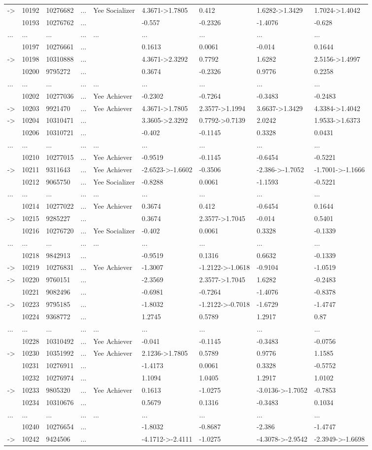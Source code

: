 \documentclass[6pt,a4paper]{article}
\begin{document}
{\begin{longtable}{lllllllll}
-\textgreater &10192&10276682&...&Yee Socializer&4.3671-\textgreater 1.7805&0.412&1.6282-\textgreater 1.3429&1.7024-\textgreater 1.4042\tabularnewline
&10193&10276762&...&&-0.557&-0.2326&-1.4076&-0.628\tabularnewline
...&...&...&...&...&...&...&...&...\tabularnewline
&10197&10276661&...&&0.1613&0.0061&-0.014&0.1644\tabularnewline
-\textgreater &10198&10310888&...&&4.3671-\textgreater 2.3292&0.7792&1.6282&2.5156-\textgreater 1.4997\tabularnewline
&10200&9795272&...&&0.3674&-0.2326&0.9776&0.2258\tabularnewline
...&...&...&...&...&...&...&...&...\tabularnewline
&10202&10277036&...&Yee Achiever&-0.2302&-0.7264&-0.3483&-0.2483\tabularnewline
-\textgreater &10203&9921470&...&Yee Achiever&4.3671-\textgreater 1.7805&2.3577-\textgreater 1.1994&3.6637-\textgreater 1.3429&4.3384-\textgreater 1.4042\tabularnewline
-\textgreater &10204&10310471&...&&3.3605-\textgreater 2.3292&0.7792-\textgreater 0.7139&2.0242&1.9533-\textgreater 1.6373\tabularnewline
&10206&10310721&...&&-0.402&-0.1145&0.3328&0.0431\tabularnewline
...&...&...&...&...&...&...&...&...\tabularnewline
&10210&10277015&...&Yee Achiever&-0.9519&-0.1145&-0.6454&-0.5221\tabularnewline
-\textgreater &10211&9311643&...&Yee Achiever&-2.6523-\textgreater -1.6602&-0.3506&-2.386-\textgreater -1.7052&-1.7001-\textgreater -1.1666\tabularnewline
&10212&9065750&...&Yee Socializer&-0.8288&0.0061&-1.1593&-0.5221\tabularnewline
...&...&...&...&...&...&...&...&...\tabularnewline
&10214&10277022&...&Yee Achiever&0.3674&0.412&-0.6454&0.1644\tabularnewline
-\textgreater &10215&9285227&...&&0.3674&2.3577-\textgreater 1.7045&-0.014&0.5401\tabularnewline
&10216&10276720&...&Yee Socializer&-0.402&0.0061&0.3328&-0.1339\tabularnewline
...&...&...&...&...&...&...&...&...\tabularnewline
&10218&9842913&...&&-0.9519&0.1316&0.6632&-0.1339\tabularnewline
-\textgreater &10219&10276831&...&Yee Achiever&-1.3007&-1.2122-\textgreater -1.0618&-0.9104&-1.0519\tabularnewline
-\textgreater &10220&9760151&...&&-2.3569&2.3577-\textgreater 1.7045&1.6282&-0.2483\tabularnewline
&10221&9082496&...&&-0.6981&-0.7264&-1.4076&-0.8378\tabularnewline
-\textgreater &10223&9795185&...&&-1.8032&-1.2122-\textgreater -0.7018&-1.6729&-1.4747\tabularnewline
&10224&9368772&...&&1.2745&0.5789&1.2917&0.87\tabularnewline
\newpage
...&...&...&...&...&...&...&...&...\tabularnewline
&10228&10310492&...&Yee Achiever&-0.041&-0.1145&-0.3483&-0.0756\tabularnewline
-\textgreater &10230&10351992&...&Yee Achiever&2.1236-\textgreater 1.7805&0.5789&0.9776&1.1585\tabularnewline
&10231&10276911&...&&-1.4173&0.0061&0.3328&-0.5752\tabularnewline
&10232&10276974&...&&1.1094&1.0405&1.2917&1.0102\tabularnewline
-\textgreater &10233&9805320&...&Yee Achiever&0.1613&-1.0275&-3.0136-\textgreater -1.7052&-0.7853\tabularnewline
&10234&10310676&...&&0.5679&0.1316&-0.3483&0.1034\tabularnewline
...&...&...&...&...&...&...&...&...\tabularnewline
&10240&10276654&...&&-1.8032&-0.8687&-2.386&-1.4747\tabularnewline
-\textgreater &10242&9424506&...&&-4.1712-\textgreater -2.4111&-1.0275&-4.3078-\textgreater -2.9542&-2.3949-\textgreater -1.6698\tabularnewline
\hline
\end{longtable}}
\end{document}
